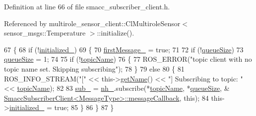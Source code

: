 Definition at line 66 of file smacc\+\_\+subscriber\+\_\+client.\+h.



Referenced by multirole\+\_\+sensor\+\_\+client\+::\+Cl\+Multirole\+Sensor$<$ sensor\+\_\+msgs\+::\+Temperature $>$\+::initialize().


\begin{DoxyCode}
67   \{
68     \textcolor{keywordflow}{if} (!\hyperlink{classsmacc_1_1client__bases_1_1SmaccSubscriberClient_a2096c76f6464d0a513625cc53dba51ed}{initialized\_})
69     \{
70       \hyperlink{classsmacc_1_1client__bases_1_1SmaccSubscriberClient_a1283e89a0d33a9028a5042519c6869a6}{firstMessage\_} = \textcolor{keyword}{true};
71 
72       \textcolor{keywordflow}{if} (!\hyperlink{classsmacc_1_1client__bases_1_1SmaccSubscriberClient_a67f03f081d83476cdb7fd631b6aba450}{queueSize})
73         \hyperlink{classsmacc_1_1client__bases_1_1SmaccSubscriberClient_a67f03f081d83476cdb7fd631b6aba450}{queueSize} = 1;
74 
75       \textcolor{keywordflow}{if} (!\hyperlink{classsmacc_1_1client__bases_1_1SmaccSubscriberClient_aeadf21a09412c6c9488e5acd50fb4f40}{topicName})
76       \{
77         ROS\_ERROR(\textcolor{stringliteral}{"topic client with no topic name set. Skipping subscribing"});
78       \}
79       \textcolor{keywordflow}{else}
80       \{
81         ROS\_INFO\_STREAM(\textcolor{stringliteral}{"["} << this->\hyperlink{classsmacc_1_1ISmaccClient_a20846aabfd1de832aa27d7a8237a1742}{getName}() << \textcolor{stringliteral}{"] Subscribing to topic: "} << 
      \hyperlink{classsmacc_1_1client__bases_1_1SmaccSubscriberClient_aeadf21a09412c6c9488e5acd50fb4f40}{topicName});
82 
83         \hyperlink{classsmacc_1_1client__bases_1_1SmaccSubscriberClient_a0f69a1b0a284ae47f5d717c6ab95f089}{sub\_} = \hyperlink{classsmacc_1_1client__bases_1_1SmaccSubscriberClient_a401d2476e89e27acc2e905acd701f053}{nh\_}.subscribe(*\hyperlink{classsmacc_1_1client__bases_1_1SmaccSubscriberClient_aeadf21a09412c6c9488e5acd50fb4f40}{topicName}, *\hyperlink{classsmacc_1_1client__bases_1_1SmaccSubscriberClient_a67f03f081d83476cdb7fd631b6aba450}{queueSize}, &
      \hyperlink{classsmacc_1_1client__bases_1_1SmaccSubscriberClient_acf85b80439aff5cf2bfa0649e9e45654}{SmaccSubscriberClient<MessageType>::messageCallback}, \textcolor{keyword}{
      this});
84         this->\hyperlink{classsmacc_1_1client__bases_1_1SmaccSubscriberClient_a2096c76f6464d0a513625cc53dba51ed}{initialized\_} = \textcolor{keyword}{true};
85       \}
86     \}
87   \}
\end{DoxyCode}


